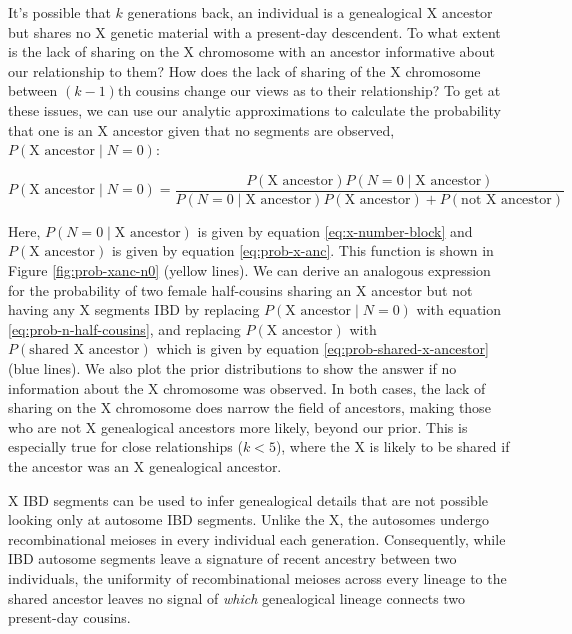 \documentclass[11pt]{article}
\begin{document}
It's possible that $k$ generations back, an individual is a genealogical X
ancestor but shares no X genetic material with a present-day descendent. To
what extent is the lack of sharing on the X chromosome with an ancestor
informative about our relationship to them? How does the lack of sharing of the
X chromosome between $(k-1)\text{th}$ cousins change our views as to their relationship?
To get at these issues, we can use our analytic approximations to calculate the
probability that one is an X ancestor given that no segments are observed,
$P(\text{X ancestor} \;|\; N = 0)$:

\begin{equation}
  \label{eq:post-x-ancs}
  P(\text{X ancestor} \;|\; N = 0) = \frac{P(\text{X ancestor})P(N = 0 \;|\; \text{X ancestor})}{P(N = 0 \;|\; \text{X ancestor})P(\text{X ancestor}) + P(\text{not X ancestor})}
\end{equation}

Here, $P(N = 0  \;|\; \text{X ancestor})$ is given by equation
\eqref{eq:x-number-block} and $P(\text{X ancestor})$ is given by equation
\eqref{eq:prob-x-anc}. This function is shown in Figure \ref{fig:prob-xanc-n0}
(yellow lines). We can derive an analogous expression for the probability of
two female half-cousins sharing an X ancestor but not having any X segments IBD
by replacing $P(\text{X ancestor} \;|\; N = 0)$ with equation
\eqref{eq:prob-n-half-cousins}, and replacing $P(\text{X ancestor})$ with
$P(\text{shared X ancestor})$ which is given by equation
\eqref{eq:prob-shared-x-ancestor} (blue lines). We also plot the prior
distributions to show the answer if no information about the X chromosome was
observed. In both cases, the lack of sharing on the X chromosome does narrow
the field of ancestors, making those who are not X genealogical ancestors more
likely, beyond our prior. This is especially true for close relationships
($k<5$), where the X is likely to be shared if the ancestor was an X
genealogical ancestor.

X IBD segments can be used to infer genealogical details that are not possible
looking only at autosome IBD segments. Unlike the X, the autosomes undergo
recombinational meioses in every individual each generation.  Consequently,
while IBD autosome segments leave a signature of recent ancestry between two
individuals, the uniformity of recombinational meioses across every lineage to
the shared ancestor leaves no signal of \emph{which} genealogical lineage
connects two present-day cousins.
\end{document}
